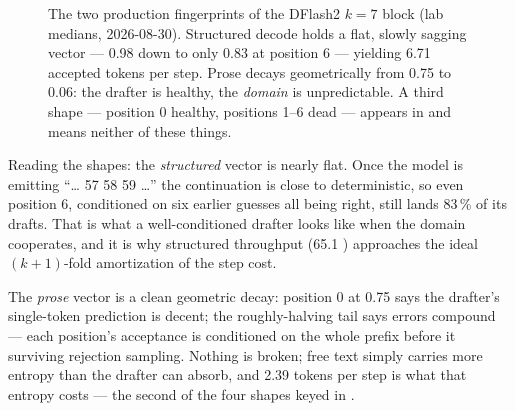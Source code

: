\begin{figure}[htbp]
\centering
{}
\caption{The two production fingerprints of the DFlash2 $k{=}7$ block (lab
medians, 2026-08-30). Structured decode holds a flat, slowly sagging vector
--- 0.98 down to only 0.83 at position 6 --- yielding 6.71 accepted tokens
per step. Prose decays geometrically from 0.75 to 0.06: the drafter is
healthy, the \emph{domain} is unpredictable. A third shape --- position 0
healthy, positions 1--6 dead --- appears in
 and means neither of these things.}
\label{fig:dflash2-fingerprints}
\end{figure}

Reading the shapes: the \emph{structured} vector is nearly flat. Once the
model is emitting ``\dots{} 57 58 59 \dots'' the continuation is close to
deterministic, so even position 6, conditioned on six earlier guesses all
being right, still lands 83\,\% of its drafts. That is what a
well-conditioned drafter looks like when the domain cooperates, and it is
why structured throughput (65.1 \tokspersec{}) approaches the ideal
$(k{+}1)$-fold amortization of the step cost.

The \emph{prose} vector is a
clean geometric decay: position 0 at 0.75 says the drafter's single-token
prediction is decent; the roughly-halving tail says errors compound ---
each position's acceptance is conditioned on the whole prefix before it
surviving rejection sampling. Nothing is broken; free text simply carries
more entropy than the drafter can absorb, and 2.39 tokens per step is what
that entropy costs --- the second of the four shapes keyed in
.

